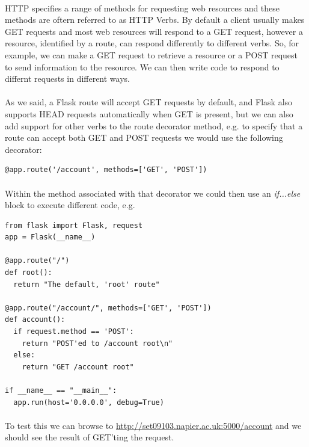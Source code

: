 \documentclass[12pt, a4paper, oneside]{book}
\begin{document}
\paragraph{} HTTP specifies a range of methods for requesting web resources and these methods are oftern referred to as HTTP Verbs. By default a client usually makes GET requests and most web resources will respond to a GET request, however a resource, identified by a route, can respond differently to different verbs. So, for example, we can make a GET request to retrieve a resource or a POST request to send information to the resource. We can then write code to respond to differnt requests in different ways.

\paragraph{} As we said, a Flask route will accept GET requests by default, and Flask also supports HEAD requests automatically when GET is present, but we can also add support for other verbs to the route decorator method, e.g. to specify that a route can accept both GET and POST requests we would use the following decorator:

\begin{lstlisting}
@app.route('/account', methods=['GET', 'POST'])
\end{lstlisting}

\paragraph{} Within the method associated with that decorator we could then use an \emph{if...else} block to execute different code, e.g. 

\begin{lstlisting}
from flask import Flask, request
app = Flask(__name__)

@app.route("/")
def root():
  return "The default, 'root' route"

@app.route("/account/", methods=['GET', 'POST'])
def account():
  if request.method == 'POST':
    return "POST'ed to /account root\n"
  else:
    return "GET /account root"

if __name__ == "__main__":
  app.run(host='0.0.0.0', debug=True)
\end{lstlisting}


\paragraph{} To test this we can browse to \url{http://set09103.napier.ac.uk:5000/account} and we should see the result of GET'ting the request.
\end{document}
